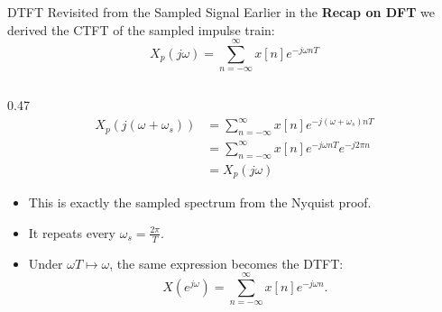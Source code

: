 \begin{frame}{DTFT Revisited from the Sampled Signal}
  Earlier in the \textbf{Recap on DFT} we derived the CTFT of the sampled impulse train:
  \begin{equation*}
    X_p(j\omega)=\sum_{n=-\infty}^{\infty} x[n]e^{-j\omega nT}
  \end{equation*}

  \begin{columns}[T]
    \begin{column}{0.47\textwidth}
      \footnotesize
      \begin{align*}
        X_p(j(\omega+\omega_s))
        &= \sum_{n=-\infty}^{\infty} x[n]e^{-j(\omega+\omega_s)nT} \\
        &= \sum_{n=-\infty}^{\infty} x[n]e^{-j\omega nT}e^{-j2\pi n} \\
        &= X_p(j\omega)
      \end{align*}
      \begin{itemize}
          \setlength{\itemsep}{0.15em}
        \item This is exactly the sampled spectrum from the Nyquist proof.
        \item It repeats every $\omega_s=\frac{2\pi}{T}$.
        \item Under $\omega T \mapsto \omega$, the same expression becomes the DTFT:
          \begin{equation*}
            X(e^{j\omega})=\sum_{n=-\infty}^{\infty} x[n]e^{-j\omega n}.
          \end{equation*}
      \end{itemize}
    \end{column}


\end{columns}
\end{frame}

